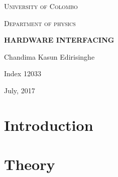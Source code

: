 \documentclass[titlepage]{article}
\numberwithin{figure}{section}
\begin{document}
\begin{titlepage}
	\centering
	\vspace*{\fill}
	{\scshape\LARGE University of Colombo \par}
	\vspace{0.1cm}
	{\scshape\Large Department of physics\par}
	\vspace{1cm}
	{\huge\bfseries HARDWARE INTERFACING\par}
	\vspace{1cm}
    Chandima Kasun Edirisinghe\par
	Index 12033\par
	July, 2017\par
    \vspace*{\fill}

\end{titlepage}

\begin{abstract}
\thispagestyle{plain}
\setcounter{page}{1}
The purpose of this report is to effectively use the LabVIEW software in data acquisition and data manipulation.
Data acquisition and data manipulation are very important aspects of many modern systems including scientific applications. The first part of the practical is based on basic operations in LabVIEW to get familiar with the GUI and the tools of the LabVIEW. The second part of the practical include applying the learnt techniques in signal generation, signal analysis and data acquisition and processing. In signal generation, a signal generator capable of producing sinusoidal, triangular, rectangular and
saw tooth signals was created. In signal analysis, an oscilloscope was created. In data acquisition and processing, a resistance meter, a capacitance meter and a diode curve generating tool were created.

\end{abstract}

\tableofcontents
\setcounter{page}{2}
\pagebreak
\listoffigures
\pagebreak


\section{Introduction}

\pagebreak
\section{Theory}

\pagebreak
\end{document}
